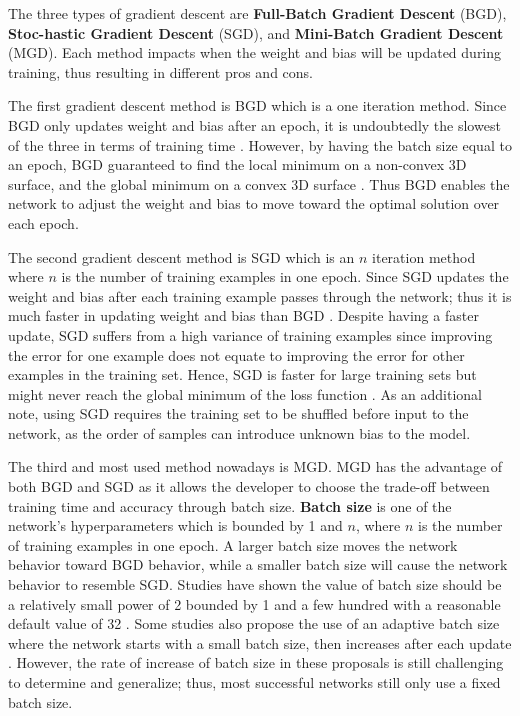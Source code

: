 The three types of gradient descent are \textbf{Full-Batch Gradient Descent} (BGD), \textbf{Stoc-hastic Gradient Descent} (SGD), and \textbf{Mini-Batch Gradient Descent} (MGD). Each method impacts when the weight and bias will be updated during training, thus resulting in different pros and cons.

The first gradient descent method is BGD which is a one iteration method. Since BGD only updates weight and bias after an epoch, it is undoubtedly the slowest of the three in terms of training time \cite{taylor2017neural}. However, by having the batch size equal to an epoch, BGD guaranteed to find the local minimum on a non-convex 3D surface, and the global minimum on a convex 3D surface \cite{taylor2017neural}. Thus BGD enables the network to adjust the weight and bias to move toward the optimal solution over each epoch.

The second gradient descent method is SGD which is an $n$ iteration method where $n$ is the number of training examples in one epoch. Since SGD updates the weight and bias after each training example passes through the network; thus it is much faster in updating weight and bias than BGD \cite{taylor2017neural}. Despite having a faster update, SGD suffers from a high variance of training examples since improving the error for one example does not equate to improving the error for other examples in the training set. Hence, SGD is faster for large training sets but might never reach the global minimum of the loss function \cite{taylor2017neural}. As an additional note, using SGD requires the training set to be shuffled before input to the network, as the order of samples can introduce unknown bias to the model.

The third and most used method nowadays is MGD. MGD has the advantage of both BGD and SGD as it allows the developer to choose the trade-off between training time and accuracy through batch size. \textbf{Batch size} is one of the network's hyperparameters which is bounded by 1 and $n$, where $n$ is the number of training examples in one epoch. A larger batch size moves the network behavior toward BGD behavior, while a smaller batch size will cause the network behavior to resemble SGD. Studies have shown the value of batch size should be a relatively small power of 2 bounded by 1 and a few hundred with a reasonable default value of 32 \cite{bengio2012practical, masters2018revisiting}. Some studies also propose the use of an adaptive batch size where the network starts with a small batch size, then increases after each update \cite{lecun2012efficient}. However, the rate of increase of batch size in these proposals is still challenging to determine and generalize; thus, most successful networks still only use a fixed batch size.

